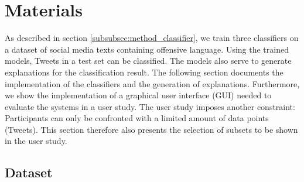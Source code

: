 \section{Materials}
As described in section \ref{subsubsec:method_classifier}, we train three classifiers on a dataset of social media texts containing offensive language. Using the trained models, Tweets in a test set can be classified. The models also serve to generate explanations for the classification result. The following section documents the implementation of the classifiers and the generation of explanations. Furthermore, we show the implementation of a graphical user interface (GUI) needed to evaluate the systems in a user study. The user study imposes another constraint: Participants can only be confronted with a limited amount of data points (Tweets). This section therefore also presents the selection of subsets to be shown in the user study.


\subsection{Dataset}

